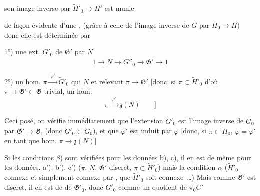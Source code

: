 \documentclass[11pt,a4paper]{article}
\begin{document}

son image inverse par $\widetilde{H}'_0 \to H'$ est munie



de façon évidente d'une ,
\struck{\ill{}} (grâce à celle de l'image inverse de $G$ par
$\widetilde{H}_0 \to H$) donc elle est déterminée par

1°) une ext. $\widetilde{G}'_0$  de $\mathfrak{G}'$ par $N$
\[
  1 \longrightarrow N \longrightarrow \widetilde{G}''_0 \longrightarrow
  \mathfrak{G}' \longrightarrow 1
\]

2°) un hom. $\pi \xrightarrow{\;\varphi'\;} \widetilde{G}'_0$ qui
 $N$ et relevant $\pi \to \mathfrak{G}'$ [donc, si
$\pi \subset \widetilde{H}'_0$ d'où \struck{$\pi \to$}
$\pi \to \mathfrak{G}' \subset \mathfrak{G}$ trivial, un hom.
\[
  \pi \xrightarrow{\;\varphi'\;} \mathfrak{z}(N) \qquad ]
\]

Ceci posé, on vérifie immédiatement que l'extension $\widetilde{G}'_0$ est
l'image inverse de $\widetilde{G}_0$ par $\mathfrak{G}' \to \mathfrak{G}$,
 (donc $\widetilde{G}'_0 \subset \widetilde{G}_0$), et que
$\varphi'$ est induit par $\varphi$ [donc, si $\pi \subset \widetilde{H}_0$,
$\varphi = \varphi'$ en tant que hom. $\pi \to \mathfrak{z}(N)$]

Si les conditions \struck{\ill{}} $\beta$) \uncertain{$\gamma$)} sont vérifiées pour les
données \struck{\ill{}} b), c), il en est de même pour les données.
\struck{\ill{}} a'), b'), c') ($\pi$, $N$, $\mathfrak{G}'$ discret,
$\pi \subset \widetilde{H}'_0$) mais la condition $\alpha$ ($\widetilde{H}'_0$
connexe et simplement connexe \ill{}  par \ill{},
\ill{} que $\widetilde{H}'_0$ soit connexe~…) Mais comme
$\mathfrak{G}'$ est discret, \struck{\ill{}} il en est de 
de $\mathfrak{G}'_0$, donc $G'_0$ \ill{} comme un quotient de
$\pi_0 \widetilde{G}'$
\end{document}
